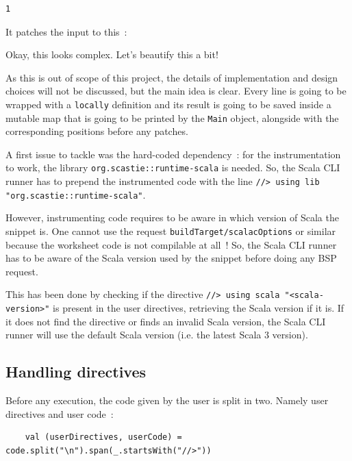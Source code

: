 \documentclass{article}
\begin{document}
\begin{lstlisting}
1
\end{lstlisting}

It patches the input to this~:



Okay, this looks complex. Let's beautify this a bit!



As this is out of scope of this project, the details of implementation and design choices will not be discussed, but the main idea is clear. Every line is going to be wrapped with a \lstinline{locally} definition and its result is going to be saved inside a mutable map that is going to be printed by the \lstinline{Main} object, alongside with the corresponding positions before any patches.

A first issue to tackle was the hard-coded dependency~: for the instrumentation to work, the library \lstinline{org.scastie::runtime-scala} is needed. So, the Scala CLI runner has to prepend the instrumented code with the line \lstinline{//> using lib "org.scastie::runtime-scala"}.

However, instrumenting code requires to be aware in which version of Scala the snippet is. One cannot use the request \lstinline{buildTarget/scalacOptions} or similar because the worksheet code is not compilable at all~! So, the Scala CLI runner has to be aware of the Scala version used by the snippet before doing any BSP request.

This has been done by checking if the directive \lstinline{//> using scala "<scala-version>"} is present in the user directives, retrieving the Scala version if it is. If it does not find the directive or finds an invalid Scala version, the Scala CLI runner will use the default Scala version (i.e. the latest Scala 3 version).


\subsection{Handling directives}

Before any execution, the code given by the user is split in two. Namely user directives and user code~:

\begin{lstlisting}
    val (userDirectives, userCode) = code.split("\n").span(_.startsWith("//>"))
\end{lstlisting}
\end{document}
